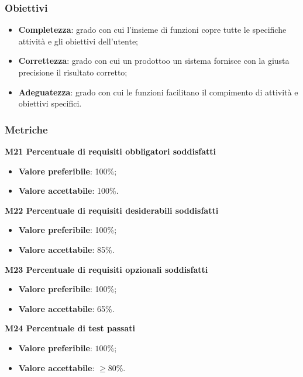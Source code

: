         \subsubsection{Obiettivi}
            \begin{itemize}
                \item \textbf{Completezza}: grado con cui l'insieme di funzioni copre tutte le specifiche attività e gli obiettivi dell'utente;
                \item \textbf{Correttezza}: grado con cui un prodotto\glosp o un sistema fornisce con la giusta precisione il risultato corretto;
                \item \textbf{Adeguatezza}: grado con cui le funzioni facilitano il compimento di attività e obiettivi specifici.
            \end{itemize}
        \subsubsection{Metriche}
            \textbf{M21 Percentuale di requisiti obbligatori soddisfatti}
                \begin{itemize}
                    \item \textbf{Valore preferibile}: 100\%;
                    \item \textbf{Valore accettabile}: 100\%.
                \end{itemize}
            \textbf{M22 Percentuale di requisiti desiderabili soddisfatti}
            \begin{itemize}
            	\item \textbf{Valore preferibile}: 100\%;
            	\item \textbf{Valore accettabile}: 85\%.
            \end{itemize}
        	\textbf{M23 Percentuale di requisiti opzionali soddisfatti}
        	\begin{itemize}
        		\item \textbf{Valore preferibile}: 100\%;
        		\item \textbf{Valore accettabile}: 65\%.
        	\end{itemize}
        	\textbf{M24 Percentuale di test passati}
        	\begin{itemize}
        		\item \textbf{Valore preferibile}: $100\%$;
        		\item \textbf{Valore accettabile}: $\ge 80\%$.
        	\end{itemize}
